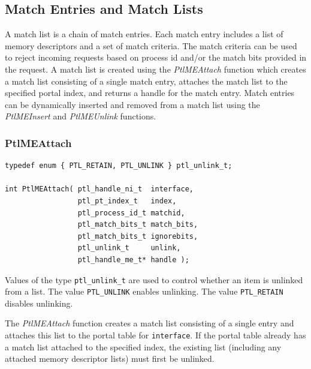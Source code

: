 \documentclass{sand-report}
\begin{document}
\subsection{Match Entries and Match Lists}\label{sec:me}

A match list is a chain of match entries.  Each match entry includes a
list of memory descriptors and a set of match criteria.  The match
criteria can be used to reject incoming requests based on process id
and/or the match bits provided in the request.  A match list is
created using the \emph{PtlMEAttach} function which creates a match
list consisting of a single match entry, attaches the match list to
the specified portal index, and returns a handle for the match entry.
Match entries can be dynamically inserted and removed from a match
list using the \emph{PtlMEInsert} and \emph{PtlMEUnlink} functions.

\subsubsection{PtlMEAttach}\label{sec:meattach}
\begin{verbatim}
typedef enum { PTL_RETAIN, PTL_UNLINK } ptl_unlink_t;

int PtlMEAttach( ptl_handle_ni_t  interface,
                 ptl_pt_index_t   index,
                 ptl_process_id_t matchid,
                 ptl_match_bits_t match_bits,
                 ptl_match_bits_t ignorebits,
                 ptl_unlink_t     unlink,
                 ptl_handle_me_t* handle );
\end{verbatim}

\noindent
Values of the type \texttt{ptl_unlink_t} are used to control whether
an item is unlinked from a list.  The value \texttt{PTL_UNLINK}
enables unlinking.  The value \texttt{PTL_RETAIN} disables unlinking.

The \emph{PtlMEAttach} function creates a match list consisting of a
single entry and attaches this list to the portal table for
\texttt{interface}.  If the portal table already has a match list
attached to the specified index, the existing list (including any
attached memory descriptor lists) must first be unlinked.
\end{document}

